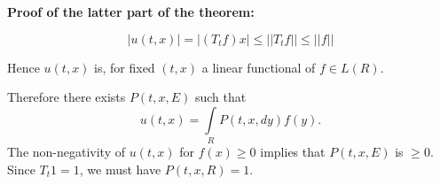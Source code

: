 \noindent \textbf{Proof of the latter part of the theorem:}
 
 $$
 | u (t, x)| = |(T_t f) x| \leq || T_t f || \leq || f ||
 $$
 
 Hence $u (t, x)$ is, for fixed $(t,x)$ a linear functional of $f \in
 L(R)$. 
 
Therefore there exists $P(t, x, E)$ such that
$$
u(t, x) = \int \limits_R P (t, x, dy) f(y).
$$
The non-negativity of $u(t, x)$ for $f(x) \geq 0$ implies that $P(t,x,
E)$ is $\geq 0$. Since $T_t 1=1$, we must have $P(t, x, R)=1$. 
